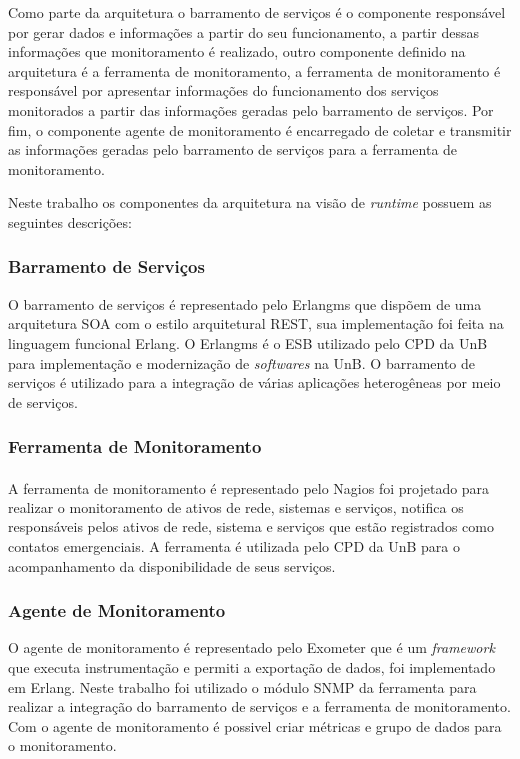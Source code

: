 Como parte da arquitetura o barramento de serviços é o componente responsável por gerar dados e informações a partir do seu funcionamento, a partir dessas informações que monitoramento é realizado, outro componente definido na arquitetura é a ferramenta de monitoramento, a ferramenta de monitoramento é responsável por apresentar informações do funcionamento dos serviços monitorados a partir das informações geradas pelo barramento de serviços. Por fim, o componente agente de monitoramento é encarregado de coletar e transmitir as informações geradas pelo barramento de serviços para a ferramenta de monitoramento.  

Neste trabalho os componentes da arquitetura na visão de \textit{runtime}\cite{clements2002documenting} possuem as seguintes descrições:

\subsubsection{Barramento de Serviços}
O barramento de serviços é representado pelo Erlangms que dispõem de uma arquitetura SOA com o estilo arquitetural REST, sua implementação foi feita na linguagem funcional Erlang. O Erlangms é o \acrshort{ESB} utilizado pelo \acrshort{CPD} da \acrshort{UnB} para implementação e modernização de \textit{softwares} na \acrshort{UnB}. O barramento de serviços é utilizado para a integração de várias aplicações heterogêneas por meio de serviços.

\subsubsection{Ferramenta de Monitoramento}
A ferramenta de monitoramento é representado pelo Nagios\textsuperscript{\textregistered} foi projetado para realizar o monitoramento de ativos de rede, sistemas e serviços, notifica os responsáveis pelos ativos de rede, sistema e serviços que estão registrados como contatos emergenciais. A ferramenta é utilizada pelo \acrshort{CPD} da \acrshort{UnB} para o acompanhamento da  disponibilidade de seus serviços.

\subsubsection{Agente de Monitoramento}
O agente de monitoramento é representado pelo Exometer que é um \textit{framework} que executa instrumentação e permiti a exportação de dados, foi implementado em Erlang. Neste trabalho foi utilizado o módulo SNMP da ferramenta para realizar a integração do barramento de serviços e a ferramenta de monitoramento. Com o agente de monitoramento é possivel criar métricas e grupo de dados para o monitoramento.

